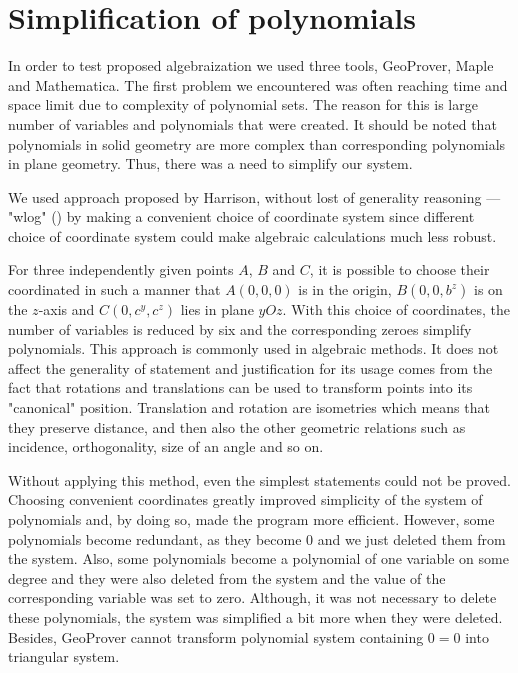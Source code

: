 \documentclass[final,1p,times,authoryear]{elsarticle}
\begin{document}
\section{Simplification of polynomials}
\label{simplification}

In order to test proposed algebraization we used three tools,
GeoProver, Maple and Mathematica. The first problem we encountered was
often reaching time and space limit due to complexity of polynomial
sets. The reason for this is large number of variables and polynomials
that were created. It should be noted that polynomials in solid
geometry are more complex than corresponding polynomials in plane
geometry. Thus, there was a need to simplify our system.

We used approach proposed by Harrison, without lost of generality
reasoning --- "wlog" (\cite{harrison}) by making a convenient choice
of coordinate system since different choice of coordinate system could
make algebraic calculations much less robust.

For three independently given points $A$, $B$ and $C$, it is possible
to choose their coordinated in such a manner that $A(0, 0, 0)$ is in
the origin, $B(0, 0, b^z)$ is on the $z$-axis and $C(0, c^y, c^z)$
lies in plane $yOz$. With this choice of coordinates, the number of
variables is reduced by six and the corresponding zeroes simplify
polynomials. This approach is commonly used in algebraic methods. It
does not affect the generality of statement and justification for its
usage comes from the fact that rotations and translations can be used
to transform points into its "canonical" position. Translation and
rotation are isometries which means that they preserve distance, and
then also the other geometric relations such as incidence,
orthogonality, size of an angle and so on.

Without applying this method, even the simplest statements could not
be proved. Choosing convenient coordinates greatly improved simplicity
of the system of polynomials and, by doing so, made the program more
efficient. However, some polynomials become redundant, as they become
$0$ and we just deleted them from the system. Also, some polynomials
become a polynomial of one variable on some degree and they were also
deleted from the system and the value of the corresponding variable
was set to zero. Although, it was not necessary to delete these
polynomials, the system was simplified a bit more when they were
deleted. Besides, GeoProver cannot transform polynomial system
containing $0 = 0$ into triangular system.
\end{document}
